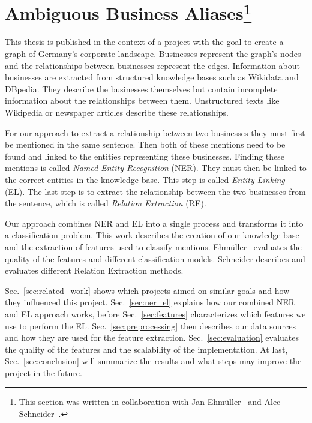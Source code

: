 \section[Ambiguous Business Aliases]{Ambiguous Business Aliases\protect\footnote{This section was written in collaboration with Jan Ehmüller~\cite{ehmueller} and Alec Schneider~\cite{schneider}.}}
\label{sec:introduction}

This thesis is published in the context of a project with the goal to create a graph of Germany's corporate landscape. Businesses represent the graph's nodes and the relationships between businesses represent the edges. Information about businesses are extracted from structured knowledge bases such as Wikidata and DBpedia. They describe the businesses themselves but contain incomplete information about the relationships between them. Unstructured texts like Wikipedia or newspaper articles describe these relationships. %

For our approach to extract a relationship between two businesses they must first be mentioned in the same sentence. Then both of these mentions need to be found and linked to the entities representing these businesses. Finding these mentions is called \textit{Named Entity Recognition} (NER). They must then be linked to the correct entities in the knowledge base. This step is called \textit{Entity Linking} (EL). The last step is to extract the relationship between the two businesses from the sentence, which is called \textit{Relation Extraction} (RE).

Our approach combines NER and EL into a single process and transforms it into a classification problem. This work describes the creation of our knowledge base and the extraction of features used to classify mentions. Ehmüller~\cite{ehmueller} evaluates the quality of the features and different classification models. Schneider \cite{schneider} describes and evaluates different Relation Extraction methods. %

Sec.~\ref{sec:related_work} shows which projects aimed on similar goals and how they influenced this project. Sec.~\ref{sec:ner_el} explains how our combined NER and EL approach works, before Sec.~\ref{sec:features} characterizes which features we use to perform the EL. Sec.~\ref{sec:preprocessing} then describes our data sources and how they are used for the feature extraction. Sec.~\ref{sec:evaluation} evaluates the quality of the features and the scalability of the implementation. At last, Sec.~\ref{sec:conclusion} will summarize the results and what steps may improve the project in the future. %



